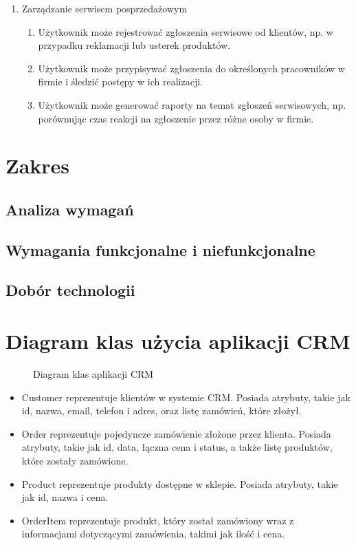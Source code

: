 \documentclass[12pt,a4paper]{article}
\begin{document}
\begin{enumerate}
\item{Zarządzanie serwisem posprzedażowym}
\begin{enumerate}
    \item Użytkownik może rejestrować zgłoszenia serwisowe od klientów, np. w przypadku reklamacji lub usterek produktów.
    \item Użytkownik może przypisywać zgłoszenia do określonych pracowników w firmie i śledzić postępy w ich realizacji.
    \item Użytkownik może generować raporty na temat zgłoszeń serwisowych, np. porównując czas reakcji na zgłoszenie przez różne osoby w firmie.
\end{enumerate}

\end{enumerate}

\newpage

\section{Zakres}

\subsection{Analiza wymagań}

\subsection{Wymagania funkcjonalne i niefunkcjonalne}

\subsection{Dobór technologii}

\newpage

\section{Diagram klas użycia aplikacji CRM}
\begin{figure}[h]
  \centering
  \caption{Diagram klas aplikacji CRM}
\end{figure}

\begin{itemize}
    \item Customer reprezentuje klientów w systemie CRM. Posiada atrybuty, takie jak id, nazwa, email, telefon i adres, oraz listę zamówień, które złożył.
    \item Order reprezentuje pojedyncze zamówienie złożone przez klienta. Posiada atrybuty, takie jak id, data, łączna cena i status, a także listę produktów, które zostały zamówione.
    \item Product reprezentuje produkty dostępne w sklepie. Posiada atrybuty, takie jak id, nazwa i cena.
    \item OrderItem reprezentuje produkt, który został zamówiony wraz z informacjami dotyczącymi zamówienia, takimi jak ilość i cena.
\end{itemize}
\end{document}

